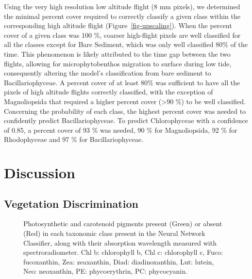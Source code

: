 \documentclass[
  number]{elsarticle}
\begin{document}
Using the very high resolution low altitude flight (8 mm pixels), we
determined the minimal percent cover required to correctly classify a
given class within the corresponding high altitude flight
(Figure~\ref{fig-upscaling}). When the percent cover of a given class
was 100 \%, coarser high-flight pixels are well classified for all the
classes except for Bare Sediment, which was only well classified 80\% of
the time. This phenomenon is likely attributed to the time gap between
the two flights, allowing for microphytobenthos migration to surface
during low tide, consequently altering the model's classification from
bare sediment to Bacillariophyceae. A percent cover of at least 80\% was
sufficient to have all the pixels of high altitude flights correctly
classified, with the exception of Magnoliopsida that required a higher
percent cover (\textgreater90 \%) to be well classified. Concerning the
probability of each class, the highest percent cover was needed to
confidently predict Bacillariophyceae. To predict Chlorophyceae with a
confidence of 0.85, a percent cover of 93 \% was needed, 90 \% for
Magnoliopsida, 92 \% for Rhodophyceae and 97 \% for Bacillariophyceae.

\section{Discussion}\label{discussion}

\subsection{Vegetation Discrimination}\label{vegetation-discrimination}

\label{cell-fig-Pigm}
\begin{figure}[H]


\caption{\label{fig-Pigm}Photosynthetic and carotenoid pigments present
(Green) or absent (Red) in each taxonomic class present in the Neural
Network Classifier, along with their absorption wavelength measured with
spectroradiometer. Chl b: chlorophyll b, Chl c: chlorophyll c, Fuco:
fucoxanthin, Zea: zeaxanthin, Diad: diadinoxanthin, Lut: lutein, Neo:
neoxanthin, PE: phycoerythrin, PC: phycocyanin.}

\end{figure}%
\end{document}
